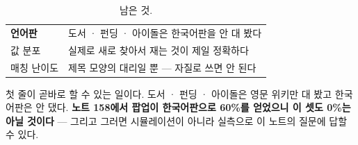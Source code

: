 \documentclass[10pt]{article}
\begin{document}
\begin{table}[t]
\centering\tsize
\caption{남은 것.}
\begin{tabular}{ll}
\toprule
\textbf{언어판} & 도서 · 펀딩 · 아이돌은 한국어판을 안 대 봤다 \\
값 분포 & 실제로 새로 찾아서 재는 것이 제일 정확하다 \\
매칭 난이도 & 제목 모양의 대리일 뿐 --- 자질로 쓰면 안 된다 \\
\bottomrule
\end{tabular}
\end{table}

첫 줄이 곧바로 할 수 있는 일이다. 도서 · 펀딩 · 아이돌은 영문 위키만 대
봤고 한국어판은 안 댔다. \textbf{노트 158에서 팝업이 한국어판으로 60\%를
얻었으니 이 셋도 0\%는 아닐 것이다} --- 그리고 그러면 시뮬레이션이 아니라
실측으로 이 노트의 질문에 답할 수 있다.
\end{document}
